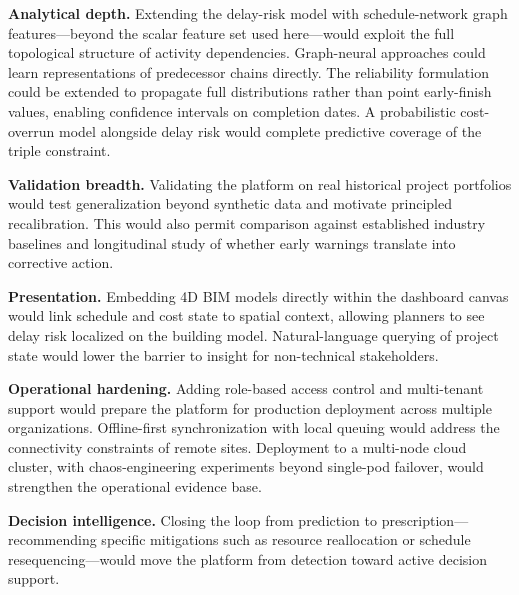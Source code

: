 \documentclass[conference]{IEEEtran}
\begin{document}
\textbf{Analytical depth.} Extending the delay-risk model with schedule-network graph features---beyond the scalar feature set used here---would exploit the full topological structure of activity dependencies. Graph-neural approaches could learn representations of predecessor chains directly. The reliability formulation could be extended to propagate full distributions rather than point early-finish values, enabling confidence intervals on completion dates. A probabilistic cost-overrun model alongside delay risk would complete predictive coverage of the triple constraint.

\textbf{Validation breadth.} Validating the platform on real historical project portfolios would test generalization beyond synthetic data and motivate principled recalibration. This would also permit comparison against established industry baselines and longitudinal study of whether early warnings translate into corrective action.

\textbf{Presentation.} Embedding 4D BIM models directly within the dashboard canvas would link schedule and cost state to spatial context, allowing planners to see delay risk localized on the building model. Natural-language querying of project state would lower the barrier to insight for non-technical stakeholders.

\textbf{Operational hardening.} Adding role-based access control and multi-tenant support would prepare the platform for production deployment across multiple organizations. Offline-first synchronization with local queuing would address the connectivity constraints of remote sites. Deployment to a multi-node cloud cluster, with chaos-engineering experiments beyond single-pod failover, would strengthen the operational evidence base.

\textbf{Decision intelligence.} Closing the loop from prediction to prescription---recommending specific mitigations such as resource reallocation or schedule resequencing---would move the platform from detection toward active decision support.



\end{document}

